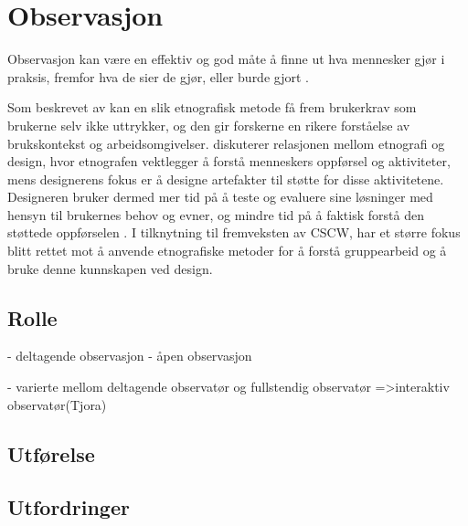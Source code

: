 \section{Observasjon}
\label{section:observasjon} 

 Observasjon kan være en effektiv og god måte å finne ut hva mennesker gjør i praksis, fremfor hva de sier de gjør, eller burde gjort \citep{Oates}.



 Som beskrevet av \citep{Millen00} kan en slik etnografisk metode få frem brukerkrav som brukerne selv ikke uttrykker, og den gir forskerne en rikere forståelse av brukskontekst og arbeidsomgivelser. \citet{Blomberg93} diskuterer relasjonen mellom etnografi og design, hvor etnografen vektlegger å forstå menneskers oppførsel og aktiviteter, mens designerens fokus er å designe artefakter til støtte for disse aktivitetene. Designeren bruker dermed mer tid på å teste og evaluere sine løsninger med hensyn til brukernes behov og evner, og mindre tid på å faktisk forstå den støttede oppførselen \citep{Blomberg93}. I tilknytning til fremveksten av CSCW, har et større fokus blitt rettet mot å anvende etnografiske metoder for å forstå gruppearbeid og å bruke denne kunnskapen ved design.

\subsection{Rolle}
- deltagende observasjon
- åpen observasjon

- varierte mellom deltagende observatør og fullstendig observatør =>interaktiv observatør(Tjora)

\subsection{Utførelse}

\subsection{Utfordringer}
